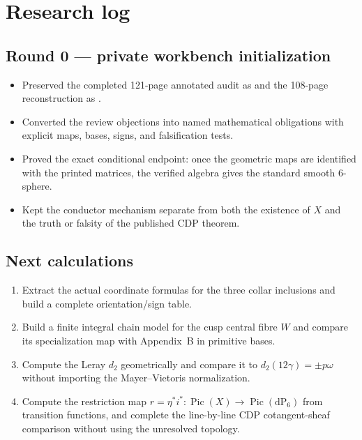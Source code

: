 \section{Research log}

\subsection*{Round 0 --- private workbench initialization}

\begin{itemize}[leftmargin=1.8em]
\item Preserved the completed 121-page annotated audit as  and the 108-page reconstruction as .
\item Converted the review objections into named mathematical obligations with explicit maps, bases, signs, and falsification tests.
\item Proved the exact conditional endpoint: once the geometric maps are identified with the printed matrices, the verified algebra gives the standard smooth $6$-sphere.
\item Kept the conductor mechanism separate from both the existence of $X$ and the truth or falsity of the published CDP theorem.
\end{itemize}

\subsection*{Next calculations}

\begin{enumerate}[leftmargin=1.8em]
\item Extract the actual coordinate formulas for the three collar inclusions and build a complete orientation/sign table.
\item Build a finite integral chain model for the cusp central fibre $W$ and compare its specialization map with Appendix~B in primitive bases.
\item Compute the Leray $d_2$ geometrically and compare it to $d_2(12\gamma)=\pm p\omega$ without importing the Mayer--Vietoris normalization.
\item Compute the restriction map
$r=\eta^*i^*:\operatorname{Pic}(X)\to\operatorname{Pic}(\mathrm{dP}_6)$
from transition functions, and complete the line-by-line CDP cotangent-sheaf
comparison without using the unresolved topology.
\end{enumerate}

